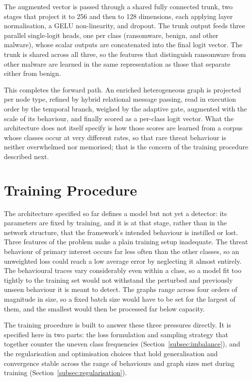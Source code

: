 \documentclass[%
    BCOR=10mm,
    DIV=13,
    toc=bibliography,
    toc=listof,
    oneside,
    12pt,
]{scrbook}
\begin{document}
The augmented vector is passed through a shared fully connected trunk, two
stages that project it to 256 and then to 128 dimensions, each applying layer
normalisation, a GELU non-linearity, and dropout. The trunk output feeds three
parallel single-logit heads, one per class (ransomware, benign, and other
malware), whose scalar outputs are concatenated into the final logit vector.
The trunk is shared across all three, so the features that distinguish
ransomware from other malware are learned in the same representation as those
that separate either from benign.

This completes the forward path. An enriched heterogeneous graph is projected
per node type, refined by hybrid relational message passing, read in execution
order by the temporal branch, weighed by the adaptive gate, augmented with the
scale of its behaviour, and finally scored as a per-class logit vector. What the
architecture does not itself specify is how those scores are learned from a
corpus whose classes occur at very different rates, so that rare threat
behaviour is neither overwhelmed nor memorised; that is the concern of the
training procedure described next.

\section{Training Procedure}
\label{sec:training}

The architecture specified so far defines a model but not yet a detector: its
parameters are fixed by training, and it is at that stage, rather than in the
network structure, that the framework's intended behaviour is instilled or lost.
Three features of the problem make a plain training setup inadequate.
The threat behaviour of primary interest occurs far less often than the other
classes, so an unweighted loss could reach a low average error by neglecting it
almost entirely. The behavioural traces vary considerably even within a class,
so a model fit too tightly to the training set would not withstand the
perturbed and previously unseen behaviour it is meant to detect. The graphs
range across four orders of magnitude in size, so a fixed batch size would have
to be set for the largest of them, and the smallest would then be processed far
below capacity.

The training procedure is built to answer these three pressures directly. It is
specified here in two parts: the loss formulation and sampling strategy that
together counter the uneven class frequencies
(Section~\ref{subsec:imbalance}), and the regularisation and optimisation
choices that hold generalisation and convergence stable across the range of
behaviours and graph sizes met during training
(Section~\ref{subsec:regularisation}).
\end{document}
